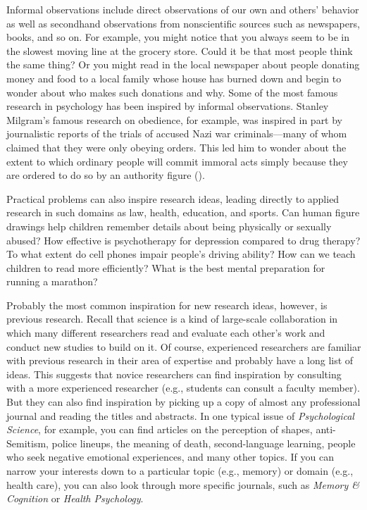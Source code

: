 \documentclass[
]{krantz}
\begin{document}
Informal observations include direct observations of our own and others' behavior as well as secondhand observations from nonscientific sources such as newspapers, books, and so on. For example, you might notice that you always seem to be in the slowest moving line at the grocery store. Could it be that most people think the same thing? Or you might read in the local newspaper about people donating money and food to a local family whose house has burned down and begin to wonder about who makes such donations and why. Some of the most famous research in psychology has been inspired by informal observations. Stanley Milgram's famous research on obedience, for example, was inspired in part by journalistic reports of the trials of accused Nazi war criminals---many of whom claimed that they were only obeying orders. This led him to wonder about the extent to which ordinary people will commit immoral acts simply because they are ordered to do so by an authority figure ().

Practical problems can also inspire research ideas, leading directly to applied research in such domains as law, health, education, and sports. Can human figure drawings help children remember details about being physically or sexually abused? How effective is psychotherapy for depression compared to drug therapy? To what extent do cell phones impair people's driving ability? How can we teach children to read more efficiently? What is the best mental preparation for running a marathon?

Probably the most common inspiration for new research ideas, however, is previous research. Recall that science is a kind of large-scale collaboration in which many different researchers read and evaluate each other's work and conduct new studies to build on it. Of course, experienced researchers are familiar with previous research in their area of expertise and probably have a long list of ideas. This suggests that novice researchers can find inspiration by consulting with a more experienced researcher (e.g., students can consult a faculty member). But they can also find inspiration by picking up a copy of almost any professional journal and reading the titles and abstracts. In one typical issue of \emph{Psychological Science}, for example, you can find articles on the perception of shapes, anti-Semitism, police lineups, the meaning of death, second-language learning, people who seek negative emotional experiences, and many other topics. If you can narrow your interests down to a particular topic (e.g., memory) or domain (e.g., health care), you can also look through more specific journals, such as \emph{Memory \& Cognition} or \emph{Health Psychology}.
\end{document}
